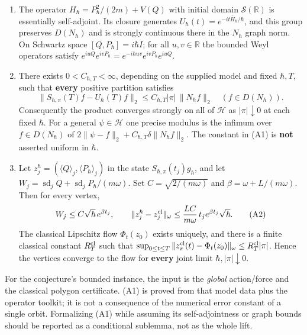 \documentclass[11pt,a4paper]{article}
\newcommand{\tightlist}{\setlength{\itemsep}{0pt}\setlength{\parskip}{0pt}}
\begin{document}
\begin{enumerate}
\def\labelenumi{\arabic{enumi}.}
\tightlist
\item
  The operator \(H_\hbar=P_\hbar^2/(2m)+V(Q)\) with initial domain
  \(\mathcal S(\mathbb R)\) is essentially self-adjoint. Its closure
  generates \(U_\hbar(t)=e^{-it\overline H_\hbar/\hbar}\), and this
  group preserves \(D(N_\hbar)\) and is strongly continuous there in the
  \(N_\hbar\) graph norm. On Schwartz space \([Q,P_\hbar]=i\hbar I\);
  for all \(u,v\in\mathbb R\) the bounded Weyl operators satisfy
  \(e^{iuQ}e^{ivP_\hbar}=e^{-i\hbar uv}e^{ivP_\hbar}e^{iuQ}\).
\item
  There exists \(0<C_{\hbar,T}<\infty\), depending on the supplied model
  and fixed \(\hbar,T\), such that \textbf{every} positive partition
  satisfies \[
   \|S_{\hbar,\pi}(T)f-U_\hbar(T)f\|_2
     \le C_{\hbar,T}|\pi|\,\|N_\hbar f\|_2
     \quad(f\in D(N_\hbar)). \tag{A1}
  \] Consequently the product converges strongly on all of
  \(\mathcal H\) as \(|\pi|\downarrow0\) at each fixed \(\hbar\). For a
  general \(\psi\in\mathcal H\) one precise modulus is the infimum over
  \(f\in D(N_\hbar)\) of
  \(2\|\psi-f\|_2+C_{\hbar,T}\delta\|N_\hbar f\|_2\). The constant in
  (A1) is \textbf{not} asserted uniform in \(\hbar\).
\item
  Let \(z_j^\hbar=(\langle Q\rangle_j,\langle P_\hbar\rangle_j)\) in the
  state \(S_{\hbar,\pi}(t_j)g_\hbar\), and let
  \(W_j=\operatorname{sd}_jQ+\operatorname{sd}_jP_\hbar/(m\omega)\). Set
  \(C=\sqrt{2/(m\omega)}\) and \(\beta=\omega+L/(m\omega)\). Then for
  every vertex, \[
   W_j\le C\sqrt\hbar\,e^{\beta t_j},\qquad
   \|z_j^\hbar-z_j^{\rm cl}\|_\omega
     \le \frac{LC}{m\omega}\,t_j e^{\beta t_j}\sqrt\hbar. \tag{A2}
  \] The classical Lipschitz flow \(\Phi_t(z_0)\) exists uniquely, and
  there is a finite classical constant \(R_T^{\rm cl}\) such that
  \(\sup_{0\le t\le T}\|z_\pi^{\rm cl}(t)-\Phi_t(z_0)\|_\omega \le R_T^{\rm cl}|\pi|\).
  Hence the vertices converge to the flow for \textbf{every} joint limit
  \(\hbar,|\pi|\downarrow0\).
\end{enumerate}

For the conjecture's bounded instance, the input is the \emph{global}
action/force and the classical polygon certificate. (A1) is proved from
that model data plus the operator toolkit; it is not a consequence of
the numerical error constant of a single orbit. Formalizing (A1) while
assuming its self-adjointness or graph bounds should be reported as a
conditional sublemma, not as the whole lift.
\end{document}
